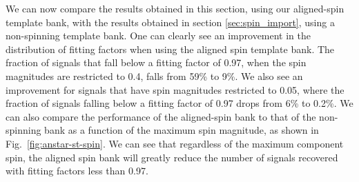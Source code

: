 We can now compare the results obtained in this section, using our aligned-spin template bank, with the results obtained in section
\ref{sec:spin_import}, using a non-spinning template bank. One can clearly see an 
improvement in the distribution of fitting factors when using the aligned spin template bank. The fraction
of signals that fall below a fitting factor of 0.97, when the spin magnitudes are restricted to 0.4, falls from 59\% to 9\%.
We also see an  improvement for signals that have spin magnitudes restricted to 0.05, where the fraction of signals falling below a
fitting factor of 0.97 drops from 6\% to 0.2\%. We can also compare the performance of the aligned-spin bank to that of the
non-spinning bank as a function of the maximum spin magnitude,
as shown in Fig.~\ref{fig:anstar-st-spin}. We can see that regardless of the maximum component
spin, the aligned spin bank will greatly reduce the number of signals recovered with fitting factors less than 0.97.

